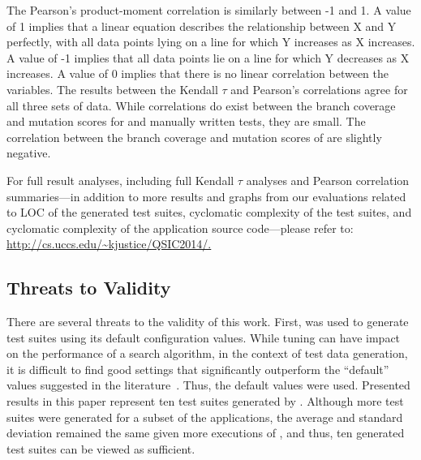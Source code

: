 The Pearson's product-moment correlation is similarly between -1 and 1.  A value of 1 implies that a linear equation
describes the relationship between X and Y perfectly, with all data points lying on a line for which Y increases as X
increases.  A value of -1 implies that all data points lie on a line for which Y decreases as X increases. A value of 0
implies that there is no linear correlation between the variables. The results between the Kendall $\tau$ and Pearson's
correlations agree for all three sets of data.  While correlations do exist between the branch coverage and mutation
scores for \evo and manually written tests, they are small.  The correlation between the branch coverage
and mutation scores of \codepro are slightly negative.  



For full result analyses, including full Kendall $\tau$ analyses and Pearson correlation summaries---in addition to more
results and graphs from our evaluations related to LOC of the generated test suites, cyclomatic complexity of the test
suites, and cyclomatic complexity of the application source code---please refer to: \url{http://cs.uccs.edu/~kjustice/QSIC2014/.}

\subsection{Threats to Validity}

There are several threats to the validity of this work.  First, \evo was used to generate test suites using its default configuration values. While tuning can have impact on the performance of a search algorithm, in the context of test data generation, it is difficult to find good settings that significantly outperform the ``default'' values suggested in the literature~\cite{arcuri2013}.  Thus, the default values were used.  Presented results in this paper represent ten test suites generated by \evo.  Although more test suites were generated for a subset of the applications, the average and standard deviation remained the same given more executions of \evo, and thus, ten generated test suites can be viewed as sufficient.

